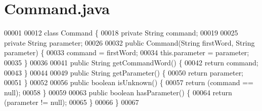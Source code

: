 \hypertarget{Command_8java_source}{\section{Command.\-java}
}

\begin{DoxyCode}
00001 
00012 \textcolor{keyword}{class }Command \{
00018     \textcolor{keyword}{private} String command;
00019 
00025     \textcolor{keyword}{private} String parameter;
00026 
00032     \textcolor{keyword}{public} Command(String firstWord, String parameter) \{
00033         command = firstWord;
00034         this.parameter = parameter;
00035     \}
00036 
00041     \textcolor{keyword}{public} String getCommandWord() \{
00042         \textcolor{keywordflow}{return} command;
00043     \}
00044 
00049     \textcolor{keyword}{public} String getParameter() \{
00050         \textcolor{keywordflow}{return} parameter;
00051     \}
00052 
00056     \textcolor{keyword}{public} \textcolor{keywordtype}{boolean} isUnknown() \{
00057         \textcolor{keywordflow}{return} (command == null);
00058     \}
00059 
00063     \textcolor{keyword}{public} \textcolor{keywordtype}{boolean} hasParameter() \{
00064         \textcolor{keywordflow}{return} (parameter != null);
00065     \}
00066 \}
00067 
\end{DoxyCode}
